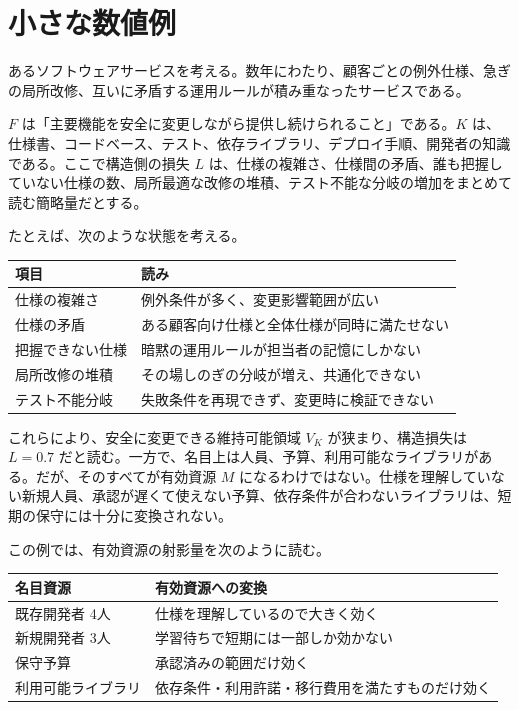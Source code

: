 \documentclass[12pt,a4paper]{article}
\begin{document}
\section{小さな数値例}\label{ux5c0fux3055ux306aux6570ux5024ux4f8b}

あるソフトウェアサービスを考える。数年にわたり、顧客ごとの例外仕様、急ぎの局所改修、互いに矛盾する運用ルールが積み重なったサービスである。

\(F\) は「主要機能を安全に変更しながら提供し続けられること」である。\(K\) は、仕様書、コードベース、テスト、依存ライブラリ、デプロイ手順、開発者の知識である。ここで構造側の損失 \(L\) は、仕様の複雑さ、仕様間の矛盾、誰も把握していない仕様の数、局所最適な改修の堆積、テスト不能な分岐の増加をまとめて読む簡略量だとする。

たとえば、次のような状態を考える。

{\def\LTcaptype{table} %
\begin{longtable}[]{@{}ll@{}}
\toprule\noalign{}
項目 & 読み \\
\midrule\noalign{}
\endhead
\bottomrule\noalign{}
\endlastfoot
仕様の複雑さ & 例外条件が多く、変更影響範囲が広い \\
仕様の矛盾 & ある顧客向け仕様と全体仕様が同時に満たせない \\
把握できない仕様 & 暗黙の運用ルールが担当者の記憶にしかない \\
局所改修の堆積 & その場しのぎの分岐が増え、共通化できない \\
テスト不能分岐 & 失敗条件を再現できず、変更時に検証できない \\
\end{longtable}
}

これらにより、安全に変更できる維持可能領域 \(V_K\) が狭まり、構造損失は \(L=0.7\) だと読む。一方で、名目上は人員、予算、利用可能なライブラリがある。だが、そのすべてが有効資源 \(M\) になるわけではない。仕様を理解していない新規人員、承認が遅くて使えない予算、依存条件が合わないライブラリは、短期の保守には十分に変換されない。

この例では、有効資源の射影量を次のように読む。

{\def\LTcaptype{table} %
\begin{longtable}[]{@{}
  >{\raggedright\arraybackslash}p{}
  >{\raggedright\arraybackslash}p{}@{}}
\toprule\noalign{}
\begin{minipage}[b]{\linewidth}\raggedright
名目資源
\end{minipage} & \begin{minipage}[b]{\linewidth}\raggedright
有効資源への変換
\end{minipage} \\
\midrule\noalign{}
\endhead
\bottomrule\noalign{}
\endlastfoot
既存開発者 4人 & 仕様を理解しているので大きく効く \\
新規開発者 3人 & 学習待ちで短期には一部しか効かない \\
保守予算 & 承認済みの範囲だけ効く \\
利用可能ライブラリ & 依存条件・利用許諾・移行費用を満たすものだけ効く \\
\end{longtable}
}
\end{document}
